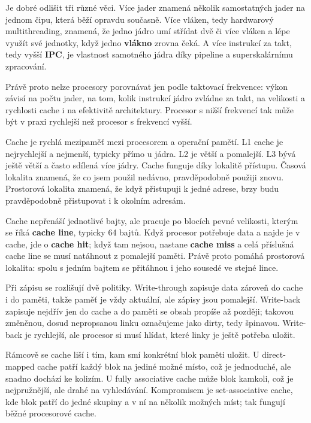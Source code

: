 \documentclass[11pt,a4paper]{article}
\begin{document}
Je dobré odlišit tři různé věci. Více jader znamená několik samostatných jader na jednom čipu, která běží opravdu současně. Více vláken, tedy hardwarový multithreading, znamená, že jedno jádro umí střídat dvě či více vláken a lépe využít své jednotky, když jedno \textbf{vlákno} zrovna čeká. A více instrukcí za takt, tedy vyšší \textbf{IPC}, je vlastnost samotného jádra díky pipeline a superskalárnímu zpracování.

Právě proto nelze procesory porovnávat jen podle taktovací frekvence: výkon závisí na počtu jader, na tom, kolik instrukcí jádro zvládne za takt, na velikosti a rychlosti cache i na efektivitě architektury. Procesor s nižší frekvencí tak může být v praxi rychlejší než procesor s frekvencí vyšší.

Cache je rychlá mezipaměť mezi procesorem a operační pamětí. L1 cache je nejrychlejší a nejmenší, typicky přímo u jádra. L2 je větší a pomalejší. L3 bývá ještě větší a často sdílená více jádry. Cache funguje díky lokalitě přístupu. Časová lokalita znamená, že co jsem použil nedávno, pravděpodobně použiji znovu. Prostorová lokalita znamená, že když přistupuji k jedné adrese, brzy budu pravděpodobně přistupovat i k okolním adresám.

Cache nepřenáší jednotlivé bajty, ale pracuje po blocích pevné velikosti, kterým se říká \textbf{cache line}, typicky 64 bajtů. Když procesor potřebuje data a najde je v cache, jde o \textbf{cache hit}; když tam nejsou, nastane \textbf{cache miss} a celá příslušná cache line se musí natáhnout z pomalejší paměti. Právě proto pomáhá prostorová lokalita: spolu s jedním bajtem se přitáhnou i jeho sousedé ve stejné lince.

Při zápisu se rozlišují dvě politiky. Write-through zapisuje data zároveň do cache i do paměti, takže paměť je vždy aktuální, ale zápisy jsou pomalejší. Write-back zapisuje nejdřív jen do cache a do paměti se obsah propíše až později; takovou změněnou, dosud nepropsanou linku označujeme jako dirty, tedy špinavou. Write-back je rychlejší, ale procesor si musí hlídat, které linky je ještě potřeba uložit.

Rámcově se cache liší i tím, kam smí konkrétní blok paměti uložit. U direct-mapped cache patří každý blok na jediné možné místo, což je jednoduché, ale snadno dochází ke kolizím. U fully associative cache může blok kamkoli, což je nejpružnější, ale drahé na vyhledávání. Kompromisem je set-associative cache, kde blok patří do jedné skupiny a v ní na několik možných míst; tak fungují běžné procesorové cache.
\end{document}
